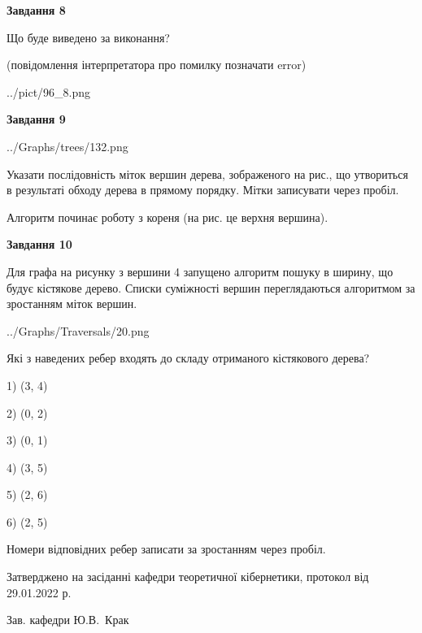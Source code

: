 \documentclass[12pt, ukrainian]{article}
\begin{document}
{\begin {large}
{\begin {center}\textbf{Завдання 8}\end {center}}\par
Що буде виведено за виконання?\par
 (повідомлення інтерпретатора про помилку позначати error)\par
\begin{center}
	{../pict/96_8.png}
\end{center}
\newpage

{\begin {center}\textbf{Завдання 9}\end {center}}\par

\begin{center}
	{../Graphs/trees/132.png}
\end{center}
Указати послідовність міток вершин дерева, зображеного на рис., що утвориться в результаті обходу дерева в прямому порядку. Мітки записувати через пробіл.\par Алгоритм починає роботу з кореня (на рис. це верхня вершина).\par
\newpage

{\begin {center}\textbf{Завдання 10}\end {center}}\par
Для графа на рисунку з вершини 4 запущено алгоритм пошуку в ширину, що будує кістякове дерево. Списки суміжності вершин переглядаються алгоритмом за зростанням міток вершин.\par
\begin{center}
	{../Graphs/Traversals/20.png}
\end{center}
\par Які з наведених ребер входять до складу отриманого кістякового дерева?\par
1) (3, 4)\par
2) (0, 2)\par
3) (0, 1)\par
4) (3, 5)\par
5) (2, 6)\par
6) (2, 5)\par
{\vskip 15pt} Номери відповідних ребер записати за зростанням через пробіл.\par
\newpage


\end {large}
}
{\smallskip \begin {small} Затверджено на засіданні кафедри теоретичної кібернетики, протокол  від   29.01.2022 р.\par\smallskip\smallskip
{\parbox {6.5 cm}{Зав. кафедри \dotfill Ю.В.~Крак}} \end{small}}
\end{document}
